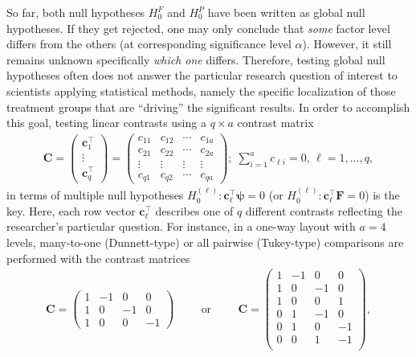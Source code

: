 So far, both null hypotheses $H_0^F$ and $H_0^P$ have been written as 
global null hypotheses. If they get rejected, one may only conclude that 
\textit{some} factor level differs from the others (at corresponding 
significance level $\alpha$). However, it still remains unknown specifically 
\textit{which one} differs. Therefore, testing global null hypotheses often 
does not answer the particular research question of interest to scientists 
applying statistical methods, namely the specific localization of those 
treatment groups that are ``driving'' the significant results. In order to 
accomplish this goal, testing linear contrasts using a $q \times a$ contrast 
matrix 
\begin{eqnarray*}
	\mathbf{C} = \left(\begin{array}{c} \mathbf{c}_1^\top\\ \vdots \\ 
	\mathbf{c}_q^\top
\end{array}\right) =\left(\begin{array}{cccc}
			c_{11} & c_{12} & \cdots & c_{1a}\\
			c_{21} & c_{22} &  \cdots & c_{2a}\\
			\vdots & \vdots & \vdots & \vdots \\
			c_{q1} &  c_{q2} &   \cdots & c_{qa}
			\end{array} \right); \; \sum_{i=1}^a c_{\ell i}=0,\, \ell=1,\ldots,q,
		\end{eqnarray*} 
in terms of multiple null hypotheses $H_0^{(\ell)}: \mathbf{c}_\ell^\top
\bm{\psi} = 0$ %
(or $H_0^{(\ell)}: \mathbf{c}_\ell^\top\bm{F}=0$) is the key. Here, each row 
vector $\mathbf{c}_\ell^\top$ describes one of $q$ different contrasts 
reflecting the researcher's particular question. For instance, in a one-way 
layout with $a=4$ levels, many-to-one (Dunnett-type) 
\citep{dunnett1955multiple} or all pairwise (Tukey-type) comparisons are 
performed with the contrast matrices 
\begin{eqnarray*}
	\mathbf{C} = \left(\begin{array}{rrrr}
			1 & -1 & 0 &  0\\
			1 & 0 & -1 & 0\\
			1 &  0 & 0  &-1
			\end{array} \right) \hspace{1cm}\text{or}\hspace{1cm}
		\mathbf{C} = \left(\begin{array}{rrrr}
			1 & -1 & 0 & 0\\
			1 & 0 & -1 & 0\\
			1 &  0 & 0& 1\\ 
				0 & 1 & -1 & 0\\
			0 & 1 & 0 & -1\\
			0 &  0 & 1& -1\\ 
			\end{array} \right),
		\end{eqnarray*} 
